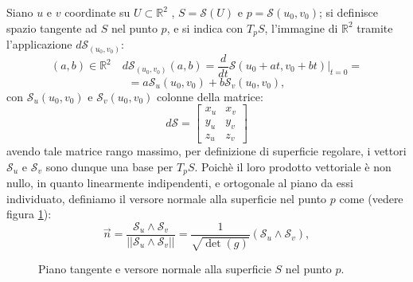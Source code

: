 Siano $u$ e $v$ coordinate su $U\subset\mathbb{R}^2$ , $S = \mathcal{S}(U)$ e $p=\mathcal{S}(u_0,v_0)$; si definisce spazio tangente ad $S$ nel punto $p$, e si indica con $T_pS$, l'immagine di $\mathbb{R}^2$ tramite l'applicazione $d\mathcal{S}_{(u_0,v_0)}$:
\[
(a,b)\in\mathbb{R}^2\quad d\mathcal{S}_{(u_0,v_0)}(a,b)= 
\frac{d}{dt}\mathcal{S}(u_0+at,v_0+bt)|_{t=0}=
\]
\[
=a\mathcal{S}_u(u_0,v_0)+b\mathcal{S}_v(u_0,v_0),
\]
con $\mathcal{S}_u(u_0,v_0)$ e $\mathcal{S}_v(u_0,v_0)$ colonne della matrice:
\[
d\mathcal{S}=
\begin{bmatrix}
  x_u & x_v \\
  y_u & y_v \\
  z_u & z_v 
\end{bmatrix}
\]
avendo tale matrice rango massimo, per definizione di superficie regolare, i vettori $\mathcal{S}_u$ e $\mathcal{S}_v$ sono dunque una base per $T_pS$. Poichè il loro prodotto vettoriale è non nullo, in quanto linearmente indipendenti, e ortogonale al piano da essi individuato, definiamo il versore normale alla superficie nel punto $p$ come (vedere figura \ref{fig:cp-111}):
\begin{equation}
  \label{eq:cp-111}
  \vec{n} = \frac{\mathcal{S}_u\wedge\mathcal{S}_v}{||\mathcal{S}_u\wedge\mathcal{S}_v||}=\frac{1}{\sqrt{\det(g)}}(\mathcal{S}_u\wedge\mathcal{S}_v),
\end{equation}
\begin{figure}[!hp]

  \caption{Piano tangente e versore normale alla superficie $S$ nel punto $p$.}
  \label{fig:cp-111}
\end{figure}
